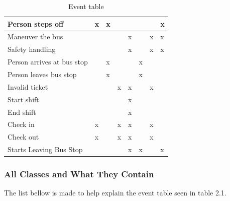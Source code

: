 \begin{table}[H]
{\begin{tabular}{|l|l|l|l|l|l|l|l|}
Person steps off           & x         & x                   &        &            &          &                & x   \\ \hline
Maneuver the bus           &           &                     &        & x          &          & x              & x   \\ \hline
Safety handling            &           &                     &        & x          &          & x              & x   \\ \hline
Person arrives at bus stop &           & x                   &        &            & x        &                &     \\ \hline
Person leaves bus stop     &           & x                   &        &            & x        &                &     \\ \hline
Invalid ticket             &           &                     & x      & x          &          & x              &     \\ \hline
Start shift                &           &                     &        & x          &          &                &     \\ \hline
End shift                  &           &                     &        & x          &          &                &     \\ \hline
Check in                   & x         &                     & x      & x          &          & x              &     \\ \hline
Check out                  & x         &                     & x      & x          &          & x              &     \\ \hline
Starts Leaving Bus Stop            &           &                     &        & x          & x        &                & x   \\ \hline
\end{tabular}%
}
\label{event-table}
\caption{Event table}
\end{table}

\subsubsection{All Classes and What They Contain}

The list bellow is made to help explain the event table seen in table 2.1.%

